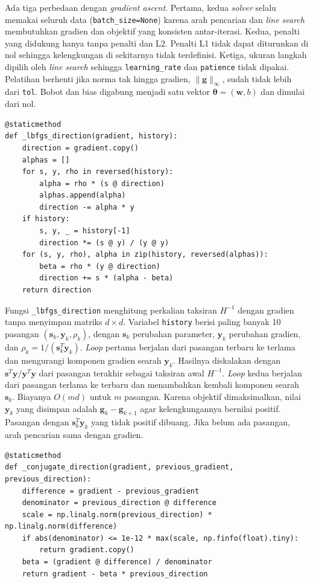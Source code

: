 Ada tiga perbedaan dengan \textit{gradient ascent}. Pertama, kedua
\textit{solver} selalu memakai seluruh data (\texttt{batch\_size=None}) karena
arah pencarian dan \textit{line search} membutuhkan gradien dan objektif yang
konsisten antar-iterasi. Kedua, penalti yang didukung hanya tanpa penalti
dan L2. Penalti L1 tidak dapat diturunkan di nol sehingga kelengkungan di
sekitarnya tidak terdefinisi. Ketiga, ukuran langkah dipilih oleh \textit{line
search} sehingga \texttt{learning\_rate} dan \texttt{patience} tidak dipakai.
Pelatihan berhenti jika norma tak hingga gradien, $\lVert\mathbf{g}\rVert_\infty$,
sudah tidak lebih dari \texttt{tol}. Bobot dan bias digabung menjadi satu
vektor $\boldsymbol{\theta}=(\mathbf{w},b)$ dan dimulai dari nol.

\begin{lstlisting}[caption={Arah pencarian L-BFGS dengan \textit{two-loop recursion}}, label={lst:lbfgs}]
@staticmethod
def _lbfgs_direction(gradient, history):
    direction = gradient.copy()
    alphas = []
    for s, y, rho in reversed(history):
        alpha = rho * (s @ direction)
        alphas.append(alpha)
        direction -= alpha * y
    if history:
        s, y, _ = history[-1]
        direction *= (s @ y) / (y @ y)
    for (s, y, rho), alpha in zip(history, reversed(alphas)):
        beta = rho * (y @ direction)
        direction += s * (alpha - beta)
    return direction
\end{lstlisting}

Fungsi \texttt{\_lbfgs\_direction} menghitung perkalian taksiran $H^{-1}$
dengan gradien tanpa menyimpan matriks $d\times d$. Variabel
\texttt{history} berisi paling banyak 10 pasangan $(\mathbf{s}_k,\mathbf{y}_k,\rho_k)$,
dengan $\mathbf{s}_k$ perubahan parameter, $\mathbf{y}_k$ perubahan gradien, dan
$\rho_k=1/(\mathbf{s}_k^{T}\mathbf{y}_k)$. \textit{Loop} pertama berjalan dari
pasangan terbaru ke terlama dan mengurangi komponen gradien searah
$\mathbf{y}_k$. Hasilnya diskalakan dengan
$\mathbf{s}^{T}\mathbf{y}/\mathbf{y}^{T}\mathbf{y}$ dari pasangan terakhir
sebagai taksiran awal $H^{-1}$. \textit{Loop} kedua berjalan dari pasangan
terlama ke terbaru dan menambahkan kembali komponen searah $\mathbf{s}_k$.
Biayanya $O(md)$ untuk $m$ pasangan. Karena objektif dimaksimalkan, nilai
$\mathbf{y}_k$ yang disimpan adalah $\mathbf{g}_k-\mathbf{g}_{k+1}$ agar
kelengkungannya bernilai positif. Pasangan dengan
$\mathbf{s}_k^{T}\mathbf{y}_k$ yang tidak positif dibuang. Jika belum ada
pasangan, arah pencarian sama dengan gradien.

\begin{lstlisting}[caption={Arah \textit{conjugate gradient} Hestenes--Stiefel}, label={lst:cg}]
@staticmethod
def _conjugate_direction(gradient, previous_gradient, previous_direction):
    difference = gradient - previous_gradient
    denominator = previous_direction @ difference
    scale = np.linalg.norm(previous_direction) * np.linalg.norm(difference)
    if abs(denominator) <= 1e-12 * max(scale, np.finfo(float).tiny):
        return gradient.copy()
    beta = (gradient @ difference) / denominator
    return gradient - beta * previous_direction
\end{lstlisting}

